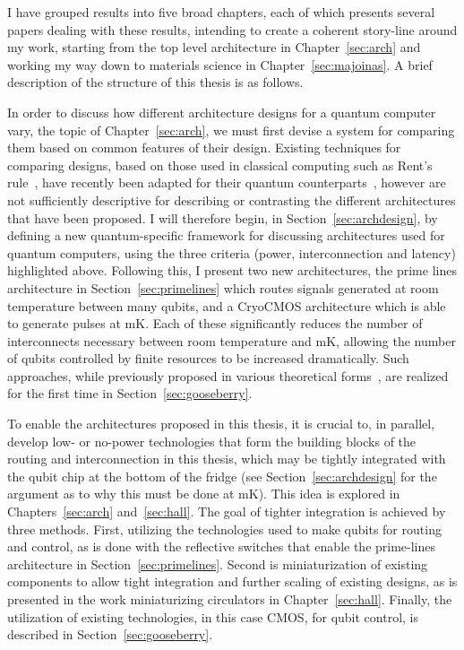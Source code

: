 I have grouped results into five broad chapters, each of which presents several papers dealing
with these results, intending to create a coherent story-line around my work, starting from the top
level architecture in Chapter~\ref{sec:arch} and working my way down to materials science in Chapter~\ref{sec:majoinas}.
A brief description of the structure of this thesis is as follows.

In order to discuss how different architecture designs for a quantum computer vary, the topic of Chapter~\ref{sec:arch},
we must first devise a system for comparing them
based on common features of their design. Existing techniques for comparing designs, based on those used in classical computing
such as Rent's rule~\cite{5388820}, have recently been adapted for their quantum counterparts~\cite{FRANKE20191}, however are
not sufficiently descriptive for describing or contrasting the different architectures that have been proposed. I will therefore begin, in
Section~\ref{sec:archdesign}, by defining a new quantum-specific framework for discussing architectures used for quantum computers,
using the three criteria (power, interconnection and latency) highlighted above. Following this, I present two new architectures,
the prime lines architecture in Section~\ref{sec:primelines} which routes signals generated at room temperature between many qubits,
and a CryoCMOS architecture which is able to generate pulses at \si{\milli\kelvin}. Each of these significantly reduces the number of interconnects necessary between
room temperature and \si{\milli\kelvin}, allowing the number of qubits controlled by finite resources to be increased dramatically. Such approaches,
while previously proposed in various theoretical forms~\cite{10.1038/npjqi.2015.11,s41467-017-01905-6}, are realized for the first
time in Section~\ref{sec:gooseberry}.

To enable the architectures proposed in this thesis, it is crucial to, in parallel, develop low- or no-power technologies that
form the building blocks of the routing and interconnection in this thesis, which may be tightly integrated with the qubit
chip at the bottom of the fridge (see Section~\ref{sec:archdesign} for the argument as to why this must be done at \si{\milli\kelvin}). This idea is explored
in Chapters~\ref{sec:arch} and~\ref{sec:hall}. The goal of tighter integration is achieved by three methods. First, utilizing the
technologies used to make qubits for routing and control, as is done with the reflective switches that enable the prime-lines
architecture in Section~\ref{sec:primelines}. Second is miniaturization of existing components to allow tight integration and
further scaling of existing designs, as is presented in the work miniaturizing circulators in Chapter~\ref{sec:hall}. Finally,
the utilization of existing technologies, in this case CMOS, for qubit control, is described in Section~\ref{sec:gooseberry}.

